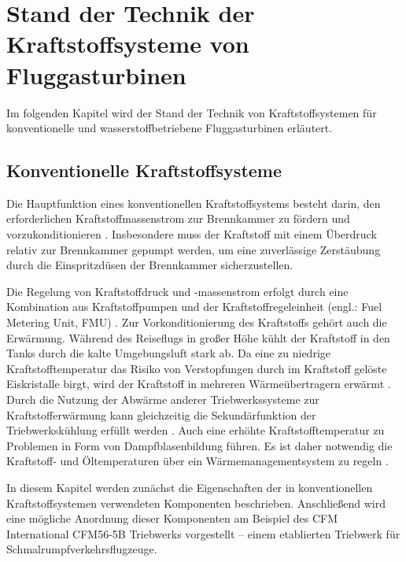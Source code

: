 \chapter{Stand der Technik der Kraftstoffsysteme von Fluggasturbinen}\label{chap:grundlagen}

Im folgenden Kapitel wird der Stand der Technik von Kraftstoffsystemen für konventionelle und wasserstoffbetriebene Fluggasturbinen erläutert.

\section{Konventionelle Kraftstoffsysteme}

Die Hauptfunktion eines konventionellen Kraftstoffsystems besteht darin, den erforderlichen Kraftstoffmassenstrom zur Brennkammer zu fördern und vorzukonditionieren \cite{Jackson.2015}. Insbesondere muss der Kraftstoff mit einem Überdruck relativ zur Brennkammer gepumpt werden, um eine zuverlässige Zerstäubung durch die Einspritzdüsen der Brennkammer sicherzustellen. 

Die Regelung von Kraftstoffdruck und  -massenstrom erfolgt durch eine Kombination aus Kraftstoffpumpen und der Kraftstoffregeleinheit (engl.: Fuel Metering Unit, FMU) \cite{Braunling.2015}. Zur Vorkonditionierung des Kraftstoffs gehört auch die Erwärmung. Während des Reiseflugs in großer Höhe kühlt der Kraftstoff in den Tanks durch die kalte Umgebungsluft stark ab. Da eine zu niedrige Kraftstofftemperatur das Risiko von Verstopfungen durch im Kraftstoff gelöste Eiskristalle birgt, wird der Kraftstoff in mehreren Wärmeübertragern erwärmt \cite{Doman.2015}. Durch die Nutzung der Abwärme anderer Triebwerkssysteme zur Kraftstofferwärmung kann gleichzeitig die Sekundärfunktion der Triebwerkskühlung erfüllt werden \cite{Braunling.2015, Jackson.2015}. Auch eine erhöhte Kraftstofftemperatur zu Problemen in Form von Dampfblasenbildung führen. Es ist daher notwendig die Kraftstoff- und Öltemperaturen über ein Wärmemanagementsystem zu regeln \cite{Braunling.2015}. 

In diesem Kapitel werden zunächst die Eigenschaften der in konventionellen Kraftstoffsystemen verwendeten Komponenten beschrieben. Anschließend wird eine mögliche Anordnung dieser Komponenten am Beispiel des CFM International CFM56-5B Triebwerks vorgestellt – einem etablierten Triebwerk für Schmalrumpfverkehrsflugzeuge.



